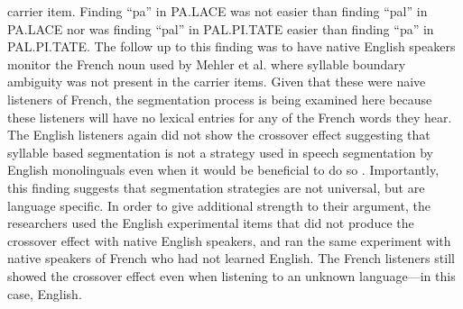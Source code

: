 carrier item. Finding “pa” in PA.LACE was not easier than finding “pal” in PA.LACE nor was finding “pal” in PAL.PI.TATE easier than finding “pa” in PAL.PI.TATE. The follow up to this finding was to have native English speakers monitor the French noun used by Mehler et al. \parencite*{Mehler1981-vi} where syllable boundary ambiguity was not present in the carrier items. Given that these were naive listeners of French, the segmentation process is being examined here because these listeners will have no lexical entries for any of the French words they hear. The English listeners again did not show the crossover effect suggesting that syllable based segmentation is not a strategy used in speech segmentation by English monolinguals even when it would be beneficial to do so \parencite{Cutler1986-zl}. Importantly, this finding suggests that segmentation strategies are not universal, but are language specific. In order to give additional strength to their argument, the researchers used the English experimental items that did not produce the crossover effect with native English speakers, and ran the same experiment with native speakers of French who had not learned English. The French listeners still showed the crossover effect even when listening to an unknown language—in this case, English. 
